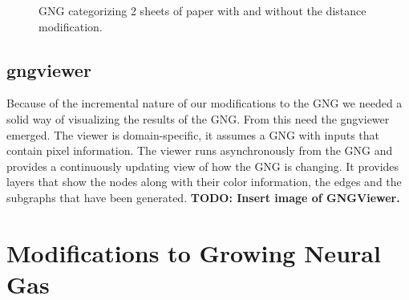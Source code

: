 \documentclass{article}
\renewcommand{\|}{\origbar} %
\begin{document}
\begin{figure}[h!]
  \centering


  \caption{GNG categorizing 2 sheets of paper with and without the distance modification.}
  \label{fig:distModification}
\end{figure}

\subsection{gngviewer}

Because of the incremental nature of our modifications to the GNG we needed a solid way of visualizing the results of the GNG. From this need the gngviewer emerged. The viewer is domain-specific, it assumes a GNG with inputs that contain pixel information. The viewer runs asynchronously from the GNG and provides a continuously updating view of how the GNG is changing. It provides layers that show the nodes along with their color information, the edges and the subgraphs that have been generated. {\bf TODO: Insert image of GNGViewer.}


\section{Modifications to Growing Neural Gas}
\label{sec:modificationsGNG}
\end{document}
